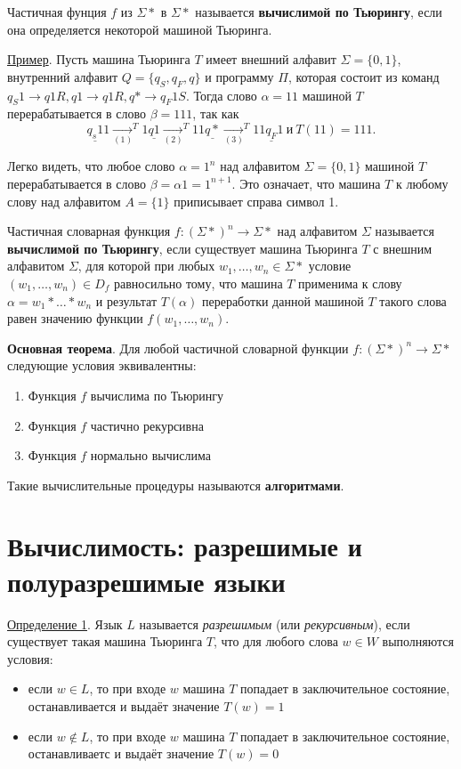 \dftion Частичная фунция $f$ из $\Sigma*$ в $\Sigma*$ называется \textbf{вычислимой по Тьюрингу}, если она определяется некоторой машиной Тьюринга.

\underline{Пример}. Пусть машина Тьюринга $T$ имеет внешний алфавит $\Sigma=\{0,1\}$, внутренний алфавит $Q=\{q_S,q_F, q\}$ и программу $\Pi$, которая состоит из команд $q_S1\to q1R, q1\to q1R, q* \to q_F 1S$. Тогда слово $\alpha=11$ машиной $T$ перерабатывается в слово $\beta=111$, так как
$$ \underline{q_s1}1 \underset{(1)}\to^T 1\underline{q1} \underset{(2)}\to^T 11\underline{q*} \underset{(3)}\to^T 11\underline{q_F}1 ~ \text{и} ~ T(11) = 111. $$

Легко видеть, что любое слово $\alpha = 1^n$ над алфавитом $\Sigma=\{0, 1\}$ машиной $T$ перерабатывается в слово $\beta = \alpha 1 = 1^{n+1}$. Это означает, что машина $T$ к любому слову над алфавитом $A = \{1\}$ приписывает справа символ 1.

\dftion Частичная словарная функция $f:(\Sigma*)^n \to \Sigma*$ над алфавитом $\Sigma$ называется \textbf{вычислимой по Тьюрингу}, если существует машина Тьюринга $T$ с внешним алфавитом $\Sigma$, для которой при любых $w_1, \dots, w_n \in \Sigma*$ условие $(w_1, \dots, w_n) \in D_f$ равносильно тому, что машина $T$ применима к слову $\alpha = w_1 * \dots * w_n$ и результат $T(\alpha)$ переработки данной машиной $T$ такого слова равен значению функции $f(w_1,\dots,w_n)$.

\textbf{Основная теорема}.
Для любой частичной словарной функции $f: (\Sigma*)^n \to \Sigma*$ следующие условия эквивалентны:

\begin{enumerate}
    \item Функция $f$ вычислима по Тьюрингу
    \item Функция $f$ частично рекурсивна
    \item Функция $f$ нормально вычислима
\end{enumerate}

Такие вычислительные процедуры называются \textbf{алгоритмами}.

\section{Вычислимость: разрешимые и полуразрешимые языки}
\underline{Определение 1}. Язык $L$ называется \textit{разрешимым} (или \textit{рекурсивным}), если существует такая машина Тьюринга $T$, что для любого слова $w \in W$ выполняются условия:
\begin{itemize}
    \item если $w \in L$, то при входе $w$ машина $T$ попадает в заключительное состояние, останавливается и выдаёт значение $T(w) = 1$
    \item если $w \not \in L$, то при входе $w$ машина $T$ попадает в заключительное состояние, останавливаетс и выдаёт значение $T(w) = 0$
\end{itemize}

